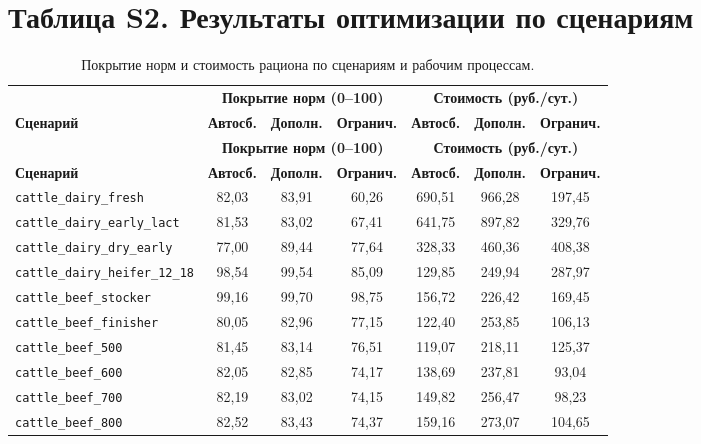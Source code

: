 \documentclass[11pt]{article}
\begin{document}
\section*{Таблица S2. Результаты оптимизации по сценариям}
\begin{longtable}{lcccccc}
\caption{Покрытие норм и стоимость рациона по сценариям и рабочим процессам.}\label{tab:s2_cases} \\
\toprule
& \multicolumn{3}{c}{\textbf{Покрытие норм (0--100)}} & \multicolumn{3}{c}{\textbf{Стоимость (руб./сут.)}} \\
\cmidrule(lr){2-4} \cmidrule(lr){5-7}
\textbf{Сценарий} & \textbf{Автосб.} & \textbf{Дополн.} & \textbf{Огранич.} & \textbf{Автосб.} & \textbf{Дополн.} & \textbf{Огранич.} \\
\midrule
\endfirsthead
\toprule
& \multicolumn{3}{c}{\textbf{Покрытие норм (0--100)}} & \multicolumn{3}{c}{\textbf{Стоимость (руб./сут.)}} \\
\cmidrule(lr){2-4} \cmidrule(lr){5-7}
\textbf{Сценарий} & \textbf{Автосб.} & \textbf{Дополн.} & \textbf{Огранич.} & \textbf{Автосб.} & \textbf{Дополн.} & \textbf{Огранич.} \\
\midrule
\endhead
\bottomrule
\endfoot
\bottomrule
\endlastfoot
\texttt{cattle\_dairy\_fresh} & 82{,}03 & 83{,}91 & 60{,}26 & 690{,}51 & 966{,}28 & 197{,}45 \\
\texttt{cattle\_dairy\_early\_lact} & 81{,}53 & 83{,}02 & 67{,}41 & 641{,}75 & 897{,}82 & 329{,}76 \\
\texttt{cattle\_dairy\_dry\_early} & 77{,}00 & 89{,}44 & 77{,}64 & 328{,}33 & 460{,}36 & 408{,}38 \\
\texttt{cattle\_dairy\_heifer\_12\_18} & 98{,}54 & 99{,}54 & 85{,}09 & 129{,}85 & 249{,}94 & 287{,}97 \\
\texttt{cattle\_beef\_stocker} & 99{,}16 & 99{,}70 & 98{,}75 & 156{,}72 & 226{,}42 & 169{,}45 \\
\texttt{cattle\_beef\_finisher} & 80{,}05 & 82{,}96 & 77{,}15 & 122{,}40 & 253{,}85 & 106{,}13 \\
\texttt{cattle\_beef\_500} & 81{,}45 & 83{,}14 & 76{,}51 & 119{,}07 & 218{,}11 & 125{,}37 \\
\texttt{cattle\_beef\_600} & 82{,}05 & 82{,}85 & 74{,}17 & 138{,}69 & 237{,}81 & 93{,}04 \\
\texttt{cattle\_beef\_700} & 82{,}19 & 83{,}02 & 74{,}15 & 149{,}82 & 256{,}47 & 98{,}23 \\
\texttt{cattle\_beef\_800} & 82{,}52 & 83{,}43 & 74{,}37 & 159{,}16 & 273{,}07 & 104{,}65 \\

\end{longtable}
\end{document}
